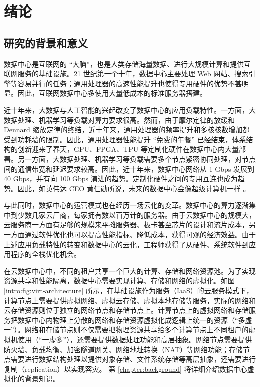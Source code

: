 \chapter{绪论}

\section{研究的背景和意义}


数据中心是互联网的 ``大脑''，也是人类存储海量数据、进行大规模计算和提供互联网服务的基础设施。21 世纪第一个十年，数据中心主要处理 Web 网站、搜索引擎等容易并行的任务；通用处理器的高速性能提升也使得专用硬件的优势不甚明显。因此，互联网数据中心多使用大量低成本的标准服务器搭建。

近十年来，大数据与人工智能的兴起改变了数据中心的应用负载特性。一方面，大数据处理、机器学习等负载对算力要求很高。然而，由于摩尔定律的放缓和 Dennard 缩放定律的终结，近十年来，通用处理器的频率提升和多核核数增加都受到功耗墙的限制。因此，通用处理器性能提升 ``免费的午餐'' 已经结束，体系结构的创新迎来了春天，GPU、FPGA、TPU 等定制化硬件在数据中心内大量部署。另一方面，大数据处理、机器学习等负载需要多个节点紧密协同处理，对节点间的通信带宽和延迟要求较高。因此，近十年来，数据中心网络从 1 Gbps 发展到 40 Gbps，并有向 100 Gbps 演进的趋势。定制化硬件之间的专用互连也成为趋势。因此，如英伟达 CEO 黄仁勋所说，未来的数据中心会像超级计算机一样 \cite{nvidia-datacenter}。

与此同时，数据中心的运营模式也在经历一场云化的变革。数据中心的算力逐渐集中到少数几家云厂商，每家拥有数以百万计的服务器。由于云数据中心的规模大，云服务商一方面有足够的规模来平摊服务器、板卡甚至芯片的设计和流片成本，另一方面通过软件优化也可以提高性能指标、降低成本，获得可观的经济效益。由于上述应用负载特性的转变和数据中心的云化，工程师获得了从硬件、系统软件到应用程序的全栈优化机会。

在云数据中心中，不同的租户共享一个巨大的计算、存储和网络资源池。为了实现资源共享和性能隔离，数据中心需要实现计算、存储和网络的虚拟化。如图 \ref{intro:fig:virt-architecture} 所示，在基础设施作为服务（IaaS）的云服务模式下，计算节点上需要提供虚拟网络、虚拟云存储、虚拟本地存储等服务，实际的网络和云存储资源则位于独立的网络节点和存储节点上。计算节点上的虚拟网络和存储服务把数据中心内物理上分散的网络和存储资源虚拟化成逻辑上统一的资源（``多虚一''）。网络和存储节点则不仅需要把物理资源共享给多个计算节点上不同租户的虚拟机使用（``一虚多''），还需要提供数据处理功能和高层抽象。网络节点需要提供防火墙、负载均衡、加密隧道网关、网络地址转换（NAT）等网络功能；存储节点需要进行数据结构处理以提供对象存储、文件系统存储等高层抽象，还需要进行复制（replication）以实现容灾。
第 \ref{chapter:background} 将详细介绍数据中心虚拟化的背景知识。


